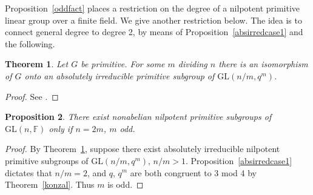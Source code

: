 \documentclass[12pt]{amsart}
\newtheorem{theorem}{Theorem}[section]
\newtheorem{proposition}[theorem]{Proposition}
\theoremstyle{definition}
\theoremstyle{remark}
\begin{document}
 Proposition~\ref{oddfact} places a restriction on the 
 degree of a  nilpotent primitive linear group over a finite
 field. 
 We give another restriction below. The idea is to
 connect  general degree to degree 2, by means of 
 Proposition~\ref{absirredcase1} and the following.
\begin{theorem}
\label{prewehr}
 Let $G$ be primitive.
 For some $m$ dividing $n$ 
 there is an isomorphism of $G$ onto an absolutely 
 irreducible primitive subgroup of
 $\mathrm{GL}(n/m,q^m)$. 
\end{theorem}
\begin{proof}
 See \cite[1.19, p.12]{Wehrfritz}.
\end{proof}
\begin{proposition}
\label{2odegree}
 There exist  nonabelian nilpotent primitive subgroups of 
 $\mathrm{GL}(n,\mathbb{F})$ only if $n = 2m$, 
 $m$ odd. 
\end{proposition}
\begin{proof}
 By Theorem~\ref{prewehr}, suppose 
 there exist absolutely irreducible nilpotent primitive
 subgroups of $\mathrm{GL}(n/m,q^m)$, $n/m>1$.
 Proposition~\ref{absirredcase1} dictates that 
 $n/m=2$, and $q$, $q^{m}$ are both congruent to 3 mod 4 
 by Theorem~\ref{konzal}. Thus $m$ is odd.
\end{proof}
\end{document}
